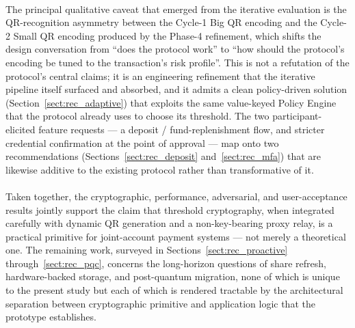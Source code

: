 \paragraph{}The principal qualitative caveat that emerged from the iterative evaluation is the QR-recognition asymmetry between the Cycle-1 Big QR encoding and the Cycle-2 Small QR encoding produced by the Phase-4 refinement, which shifts the design conversation from ``does the protocol work'' to ``how should the protocol's encoding be tuned to the transaction's risk profile''. This is not a refutation of the protocol's central claims; it is an engineering refinement that the iterative pipeline itself surfaced and absorbed, and it admits a clean policy-driven solution (Section~\ref{sect:rec_adaptive}) that exploits the same value-keyed Policy Engine that the protocol already uses to choose its threshold. The two participant-elicited feature requests --- a deposit / fund-replenishment flow, and stricter credential confirmation at the point of approval --- map onto two recommendations (Sections~\ref{sect:rec_deposit} and~\ref{sect:rec_mfa}) that are likewise additive to the existing protocol rather than transformative of it.

\paragraph{}Taken together, the cryptographic, performance, adversarial, and user-acceptance results jointly support the claim that threshold cryptography, when integrated carefully with dynamic QR generation and a non-key-bearing proxy relay, is a practical primitive for joint-account payment systems --- not merely a theoretical one. The remaining work, surveyed in Sections~\ref{sect:rec_proactive} through~\ref{sect:rec_pqc}, concerns the long-horizon questions of share refresh, hardware-backed storage, and post-quantum migration, none of which is unique to the present study but each of which is rendered tractable by the architectural separation between cryptographic primitive and application logic that the prototype establishes.
